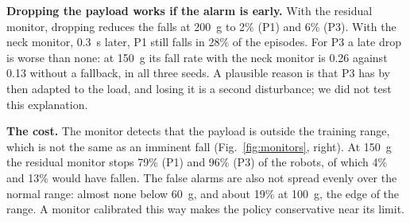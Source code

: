 \documentclass[conference]{IEEEtran}
\begin{document}
\textbf{Dropping the payload works if the alarm is early.} With the residual monitor, dropping reduces the falls at \SI{200}{g} to 2\% (P1) and 6\% (P3).
With the neck monitor, \SI{0.3}{s} later, P1 still falls in 28\% of the episodes.
For P3 a late drop is worse than none: at \SI{150}{g} its fall rate with the neck monitor is 0.26 against 0.13 without a fallback, in all three seeds. A plausible reason is that P3 has by then adapted to the load, and losing it is a second disturbance; we did not test this explanation.

\textbf{The cost.} The monitor detects that the payload is outside the training range, which is not the same as an imminent fall (Fig.~\ref{fig:monitors}, right).
At \SI{150}{g} the residual monitor stops 79\% (P1) and 96\% (P3) of the robots, of which 4\% and 13\% would have fallen.
The false alarms are also not spread evenly over the normal range: almost none below \SI{60}{g}, and about 19\% at \SI{100}{g}, the edge of the range.
A monitor calibrated this way makes the policy conservative near its limit.

\begin{table}[t]
\centering
\caption{Part III. Fall rate on the test seeds with each monitor and fallback.}
\label{tab:fallback}
\footnotesize
\setlength{\tabcolsep}{5pt}

\end{table}
\end{document}
